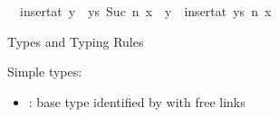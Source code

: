 \begin{isabellebody}
\ \ {\isachardoublequoteopen}insert{\isacharunderscore}{\kern0pt}at\ {\isacharparenleft}{\kern0pt}y\ {\isacharhash}{\kern0pt}\ ys{\isacharparenright}{\kern0pt}\ {\isacharparenleft}{\kern0pt}Suc\ n{\isacharparenright}{\kern0pt}\ x\ {\isacharequal}{\kern0pt}\ y\ {\isacharhash}{\kern0pt}\ insert{\isacharunderscore}{\kern0pt}at\ ys\ n\ x{\isachardoublequoteclose}%
\begin{isamarkuptext}%
Types and Typing Rules%
\end{isamarkuptext}\isamarkuptrue%
%
\begin{isamarkuptext}%
Simple types:

%
\begin{itemize}%
\item {} : base type identified by  with free links 


\end{itemize}
\end{isamarkuptext}
\end{isabellebody}
